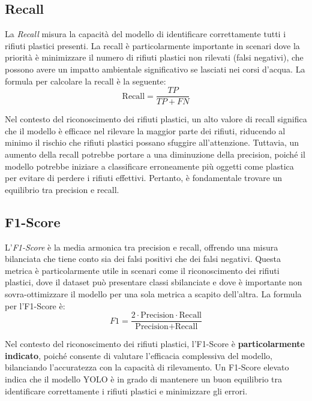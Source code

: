 \subsection*{Recall}

La \textit{Recall} misura la capacità del modello di identificare correttamente tutti i rifiuti plastici presenti. La recall è particolarmente importante in scenari dove la priorità è minimizzare il numero di rifiuti plastici non rilevati (falsi negativi), che possono avere un impatto ambientale significativo se lasciati nei corsi d'acqua. La formula per calcolare la recall è la seguente:
\begin{equation}
\text{Recall} = \frac{TP}{TP + FN}
\end{equation}

Nel contesto del riconoscimento dei rifiuti plastici, un alto valore di recall significa che il modello è efficace nel rilevare la maggior parte dei rifiuti, riducendo al minimo il rischio che rifiuti plastici possano sfuggire all'attenzione. Tuttavia, un aumento della recall potrebbe portare a una diminuzione della precision, poiché il modello potrebbe iniziare a classificare erroneamente più oggetti come plastica per evitare di perdere i rifiuti effettivi. Pertanto, è fondamentale trovare un equilibrio tra precision e recall.

\subsection*{F1-Score}

L'\textit{F1-Score} è la media armonica tra precision e recall, offrendo una misura bilanciata che tiene conto sia dei falsi positivi che dei falsi negativi. Questa metrica è particolarmente utile in scenari come il riconoscimento dei rifiuti plastici, dove il dataset può presentare classi sbilanciate e dove è importante non sovra-ottimizzare il modello per una sola metrica a scapito dell'altra. La formula per l'F1-Score è:
\begin{equation}
F1 = \frac{2 \cdot \text{Precision} \cdot \text{Recall}}{\text{Precision} + \text{Recall}}
\end{equation}

Nel contesto del riconoscimento dei rifiuti plastici, l'F1-Score è \textbf{particolarmente indicato}, poiché consente di valutare l'efficacia complessiva del modello, bilanciando l'accuratezza con la capacità di rilevamento. Un F1-Score elevato indica che il modello YOLO è in grado di mantenere un buon equilibrio tra identificare correttamente i rifiuti plastici e minimizzare gli errori.

